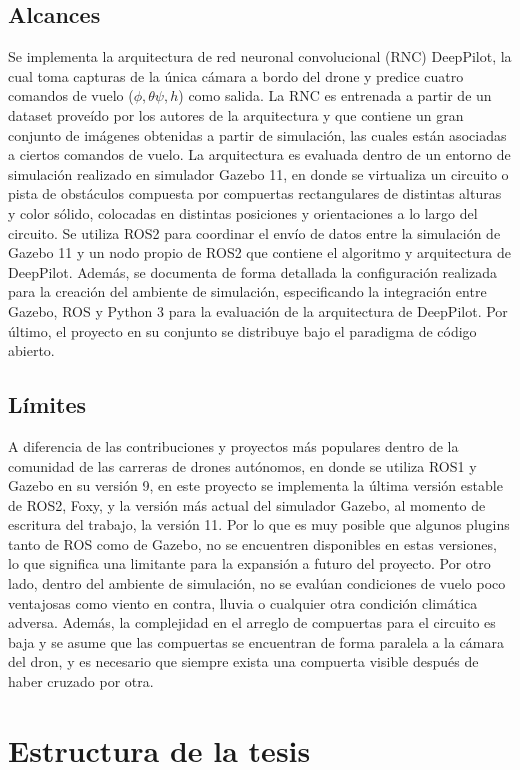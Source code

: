 \subsection{Alcances}
Se implementa la arquitectura de red neuronal convolucional (RNC) DeepPilot, la cual toma capturas de la única cámara a bordo del drone y predice cuatro comandos de vuelo ($\phi,\theta\psi,h$) como salida. La RNC es entrenada a partir de un dataset proveído por los autores de la arquitectura y que contiene un gran conjunto de imágenes obtenidas a partir de simulación, las cuales están asociadas a ciertos comandos de vuelo.    La arquitectura es evaluada dentro de un entorno de simulación realizado en simulador Gazebo 11, en donde se virtualiza un circuito o pista de obstáculos compuesta por compuertas rectangulares de distintas alturas y color sólido, colocadas en distintas posiciones y orientaciones a lo largo del circuito. Se utiliza ROS2 para coordinar el envío de datos entre la simulación de Gazebo 11 y un nodo propio de ROS2 que contiene el algoritmo y arquitectura de DeepPilot. Además, se documenta de forma detallada la configuración realizada para la creación del ambiente de simulación, especificando la integración entre Gazebo, ROS y Python 3 para la evaluación de la arquitectura de DeepPilot. Por último, el proyecto en su conjunto se distribuye bajo el paradigma de código abierto.

\subsection{Límites}
A diferencia de las contribuciones y proyectos más populares dentro de la comunidad de las carreras de drones autónomos, en donde se utiliza ROS1 y Gazebo en su versión 9, en este proyecto se implementa la última versión estable de ROS2, Foxy, y la versión más actual del simulador Gazebo, al momento de escritura del trabajo, la versión 11. Por lo que es muy posible que algunos plugins tanto de ROS como de Gazebo, no se encuentren disponibles en estas versiones, lo que significa una limitante para la expansión a futuro del proyecto.  Por otro lado, dentro del ambiente de simulación, no se evalúan condiciones de vuelo poco ventajosas como viento en contra, lluvia o cualquier otra condición climática adversa. Además, la complejidad en el arreglo de compuertas para el circuito es baja y se asume que las compuertas se encuentran de forma paralela a la cámara del dron, y  es necesario que siempre exista una compuerta visible después de haber cruzado por otra.


\section{Estructura de la tesis}






